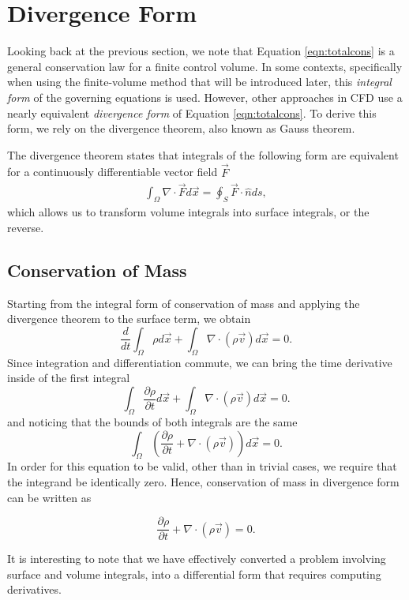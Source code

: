 \section{Divergence Form}
Looking back at the previous section, we note that Equation \ref{eqn:totalcons} is a general conservation law for a finite control volume. In some contexts, specifically when using the finite-volume method that will be introduced later, this {\it integral form} of the governing equations is used. However, other approaches in CFD use a nearly equivalent {\it divergence form} of Equation \ref{eqn:totalcons}. To derive this form, we rely on the divergence theorem, also known as Gauss theorem.
\begin{theorem}
The divergence theorem states that integrals of the following form are equivalent for a continuously differentiable vector field $\vec{F}$
\begin{align}
\int_\Omega \nabla \cdot \vec{F} d\vec{x} = \oint_S \vec{F} \cdot \hat{n} ds,
\end{align}
which allows us to transform volume integrals into surface integrals, or the reverse.
\end{theorem}

\subsection{Conservation of Mass}
Starting from the integral form of conservation of mass and applying the divergence theorem to the surface term, we obtain
\begin{equation}
	\frac{d}{dt}\int_\Omega \rho d\vec{x} + \int_\Omega \nabla \cdot (\rho \vec{v}) d\vec{x} = 0.
\end{equation}
Since integration and differentiation commute, we can bring the time derivative inside of the first integral
\begin{equation}
	\int_\Omega \frac{\partial \rho}{\partial t} d\vec{x} + \int_\Omega \nabla \cdot (\rho \vec{v}) d\vec{x} = 0.
\end{equation}
and noticing that the bounds of both integrals are the same
\begin{equation}
	\int_\Omega \left( \frac{\partial \rho}{\partial t} + \nabla \cdot (\rho \vec{v}) \right) d\vec{x} = 0.
\end{equation}
In order for this equation to be valid, other than in trivial cases, we require that the integrand be identically zero. Hence, conservation of mass in divergence form can be written as
\begin{eqBox}
\begin{equation}
	\frac{\partial \rho}{\partial t} + \nabla \cdot (\rho \vec{v}) = 0.
\end{equation}
\end{eqBox}
It is interesting to note that we have effectively converted a problem involving surface and volume integrals, into a differential form that requires computing derivatives.

